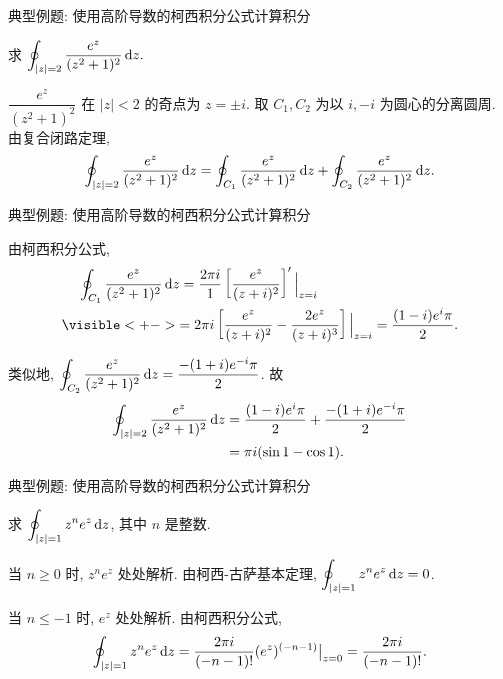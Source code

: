 \begin{frame}{典型例题: 使用高阶导数的柯西积分公式计算积分}
\begin{example}
求 $\displaystyle\oint_{|z|=2}\frac{e^z}{(z^2+1)^2}\,\mathrm{d} z.$
\end{example}
\begin{solution}
$\dfrac{e^z}{(z^2+1)^2}$ 在 $|z|<2$ 的奇点为 $z=\pm i$.
\onslide<+->
取 $C_1,C_2$ 为以 $i,-i$ 为圆心的分离圆周.
\onslide<+->
由复合闭路定理,
\[\oint_{|z|=2}\frac{e^z}{(z^2+1)^2}\,\mathrm{d} z
=\oint_{C_1}\frac{e^z}{(z^2+1)^2}\,\mathrm{d} z
+\oint_{C_2}\frac{e^z}{(z^2+1)^2}\,\mathrm{d} z.\]
\end{solution}
\end{frame}


\begin{frame}{典型例题: 使用高阶导数的柯西积分公式计算积分}
\begin{solutionc}
由柯西积分公式,
\begin{align*}
&\peq\oint_{C_1}\frac{e^z}{(z^2+1)^2}\diff z
=\frac{2\pi i}{1}\left[\frac{e^z}{(z+i)^2}\right]'\Big|_{z=i}\\
&\visible<+->{=2\pi i\left[\frac{e^z}{(z+i)^2}-\frac{2e^z}{(z+i)^3}\right]\Big|_{z=i}
=\frac{(1-i)e^i\pi}2.}
\end{align*}
\onslide<+->

类似地, $\displaystyle\oint_{C_2}\frac{e^z}{(z^2+1)^2}\,\mathrm{d} z=\frac{-(1+i)e^{-i}\pi}2$.
\onslide<+->
故
\begin{align*}
\oint_{|z|=2}\frac{e^z}{(z^2+1)^2}\,\mathrm{d} z
&=\frac{(1-i)e^i\pi}2+\frac{-(1+i)e^{-i}\pi}2\\
&=\pi i(\sin1-\cos1).
\end{align*}
\vspace{-18pt}
\end{solutionc}
\end{frame}


\begin{frame}{典型例题: 使用高阶导数的柯西积分公式计算积分}
\begin{example}
求 $\displaystyle\oint_{|z|=1}z^ne^z\,\mathrm{d} z$, 其中 $n$ 是整数.
\end{example}
\begin{solution}
\indent
当 $n\ge 0$ 时, $z^ne^z$ 处处解析.
\onslide<+->
由柯西-古萨基本定理, $\displaystyle\oint_{|z|=1}z^ne^z\,\mathrm{d} z=0$.

\indent
\onslide<+->
当 $n\le-1$ 时, $e^z$ 处处解析.
\onslide<+->
由柯西积分公式,
\[\oint_{|z|=1}z^ne^z\,\mathrm{d} z
=\frac{2\pi i}{(-n-1)!}(e^z)^{(-n-1)}\big|_{z=0}
=\frac{2\pi i}{(-n-1)!}.\]
\end{solution}
\end{frame}



